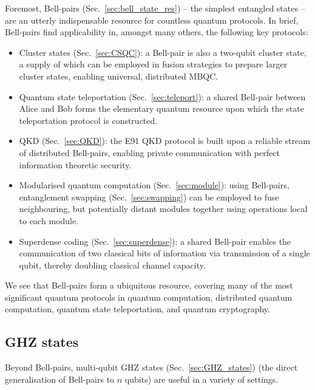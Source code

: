 Foremost, Bell-pairs (Sec.~\ref{sec:bell_state_res}) -- the simplest entangled states -- are an utterly indispensable resource for countless quantum protocols. In brief, Bell-pairs find applicability in, amongst many others, the following key protocols:
\begin{itemize}
\item Cluster states (Sec.~\ref{sec:CSQC}): a Bell-pair is also a two-qubit cluster state, a supply of which can be employed in fusion strategies to prepare larger cluster states, enabling universal, distributed MBQC.
\item Quantum state teleportation (Sec.~\ref{sec:teleport}): a shared Bell-pair between Alice and Bob forms the elementary quantum resource upon which the state teleportation protocol is constructed.
\item QKD (Sec.~\ref{sec:QKD}): the E91 QKD protocol is built upon a reliable stream of distributed Bell-pairs, enabling private communication with perfect information theoretic security.
\item Modularised quantum computation (Sec.~\ref{sec:module}): using Bell-pairs, entanglement swapping (Sec.~\ref{sec:swapping}) can be employed to fuse neighbouring, but potentially distant modules together using operations local to each module.
\item Superdense coding (Sec.~\ref{sec:superdense}): a shared Bell-pair enables the communication of two classical bits of information via transmission of a single qubit, thereby doubling classical channel capacity.
\end{itemize}

We see that Bell-pairs form a ubiquitous resource, covering many of the most significant quantum protocols in quantum computation, distributed quantum computation, quantum state teleportation, and quantum cryptography.

%
%

\subsection{GHZ states}

Beyond Bell-pairs, multi-qubit GHZ states (Sec.~\ref{sec:GHZ_states}) (the direct generalisation of Bell-pairs to $n$ qubits) are useful in a variety of settings.

